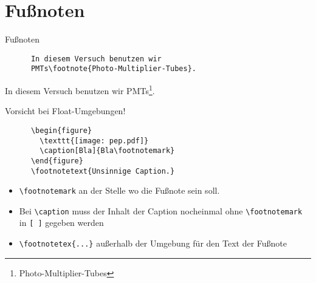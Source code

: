 \section{Fußnoten}

\begin{frame}[fragile]{Fußnoten}
  \begin{CodeExample}{0.5}
    \begin{lstlisting}
      In diesem Versuch benutzen wir 
      PMTs\footnote{Photo-Multiplier-Tubes}.
    \end{lstlisting}
    \CodeResult
    In diesem Versuch benutzen wir PMTs\footnote{Photo-Multiplier-Tubes}.
  \end{CodeExample}

  \begin{alertblock}{Vorsicht bei Float-Umgebungen!}
    \begin{lstlisting}
      \begin{figure}
        \texttt{[image: pep.pdf]}
        \caption[Bla]{Bla\footnotemark}
      \end{figure}
      \footnotetext{Unsinnige Caption.}
    \end{lstlisting}
  \end{alertblock}
  \begin{itemize}
    \item \lstinline+\footnotemark+ an der Stelle wo die Fußnote sein soll.
    \item Bei \lstinline+\caption+ muss der Inhalt der Caption nocheinmal
        ohne \lstinline+\footnotemark+ in \lstinline+[ ]+
        gegeben werden
      \item \lstinline+\footnotetex{...}+ außerhalb der Umgebung für den Text der Fußnote
  \end{itemize}

\end{frame}

